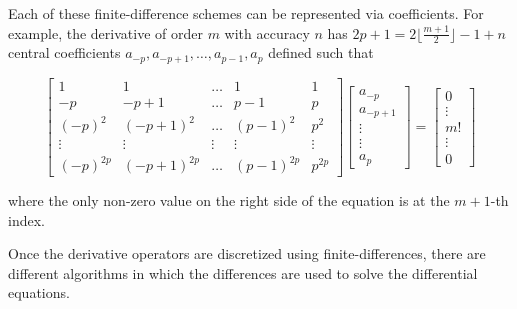 \documentclass{report}
\begin{document}
                Each of these finite-difference schemes can be represented via coefficients.  For example, the derivative of order $m$ with accuracy $n$ has $2p + 1 = 2 \lfloor \frac{m + 1}{2} \rfloor - 1 + n$ central coefficients $a_{-p}, a_{-p + 1}, \ldots, a_{p - 1}, a_p$ defined such that

                \begin{equation}
                    \begin{bmatrix}
                        1         & 1             & \ldots & 1            & 1 \\
                        -p        & -p + 1        & \ldots & p - 1        & p \\
                        (-p)^2    & (-p + 1)^2    & \ldots & (p - 1)^2    & p^2 \\
                        \vdots    & \vdots        & \vdots & \vdots       & \vdots \\
                        (-p)^{2p} & (-p + 1)^{2p} & \ldots & (p - 1)^{2p} & p^{2p} 
                    \end{bmatrix}
                    \begin{bmatrix}
                        a_{-p} \\
                        a_{-p + 1} \\
                        \vdots \\
                        \vdots \\
                        a_p
                    \end{bmatrix} = 
                    \begin{bmatrix}
                        0 \\
                        \vdots \\
                        m! \\
                        \vdots \\
                        0
                    \end{bmatrix}
                \end{equation}

                where the only non-zero value on the right side of the equation is at the $m+1$-th index.
                
                Once the derivative operators are discretized using finite-differences, there are different algorithms in which the differences are used to solve the differential equations.
\end{document}
